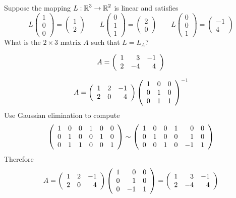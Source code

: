 \documentclass{ximera}
\author{Matthew Carr}
\begin{document}

\begin{exercise}\label{mc.exercise7}

Suppose the mapping $L:\mbox{$\Bbb{R}$}^3\to\mbox{$\Bbb{R}$}^2$ is linear and satisfies
\[
L \left(\begin{array}{c} 1 \\ 0 \\0 \end{array}\right) = \left(\begin{array}{c} 1 \\ 2  \end{array}\right) \qquad
L \left(\begin{array}{c} 0 \\ 1\\ 1 \end{array}\right) = \left(\begin{array}{c} 2 \\ 0 \end{array}\right) \qquad
L\left(\begin{array}{c} 0 \\ 0 \\ 1 \end{array}\right) = \left(\begin{array}{r} -1 \\ 4 \end{array}\right)
\]
What is the  $2\times 3$ matrix $A$ such that $L = L_A$?

  
\begin{solution}

\ans \[
A = \left(\begin{array}{rrrrrrrrrrrrrrrrrr} 1 & 3 & -1\\ 2 & -4 & 4 \end{array}\right)
\]


\soln 
\[
A = \left(\begin{array}{rrrrrrrrrrrrrrrrrr} 1 & 2 & -1\\ 2 & 0 & 4 \end{array}\right) \left(\begin{array}{rrrrrrrrrrrrrrrrrr} 1 & 0 & 0 \\ 0 & 1 & 0 \\ 0 & 1 & 1 \end{array}\right)^{-1}
\]
Use Gaussian elimination to compute 
\[
\left(\begin{array}{rrrrrrrrrrrrrrrrrr} 1 & 0 & 0 & 1 & 0 & 0\\ 0 & 1 & 0 & 0 & 1 & 0\\ 0 & 1 & 1 & 0 & 0 & 1 \end{array}\right)\sim
\left(\begin{array}{rrrrrrrrrrrrrrrrrr} 1 & 0 & 0 & 1 & 0 & 0\\ 0 & 1 & 0 & 0 & 1 & 0\\ 0 & 0 & 1 & 0 & -1 & 1 \end{array}\right)
\]
Therefore
\[
A = \left(\begin{array}{rrrrrrrrrrrrrrrrrr} 1 & 2 & -1\\ 2 & 0 & 4 \end{array}\right) \left(\begin{array}{rrrrrrrrrrrrrrrrrr}  1 & 0 & 0\\   0 & 1 & 0\\  0 & -1 & 1 \end{array}\right) = 
 \left(\begin{array}{rrrrrrrrrrrrrrrrrr} 1 & 3 & -1\\ 2 & -4 & 4 \end{array}\right) 
\]

\end{solution}
\end{exercise}
\end{document}
